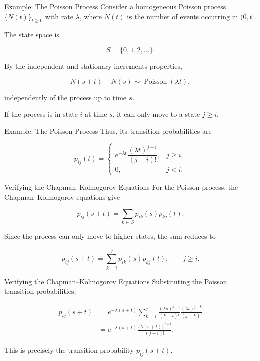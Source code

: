 \documentclass[
  ignorenonframetext,
  aspectratio=169,
]{beamer}
\begin{document}
\begin{frame}{Example: The Poisson Process}
\protect{}\label{example-the-poisson-process}
Consider a homogeneous Poisson process \(\{N(t)\}_{t\geq 0}\) with rate
\(\lambda\), where \(N(t)\) is the number of events occurring in
\((0,t]\).

The state space is

\[
S=\{0,1,2,\ldots\}.
\]

By the independent and stationary increments properties,

\[
N(s+t)-N(s)\sim\operatorname{Poisson}(\lambda t),
\]

independently of the process up to time \(s\).

If the process is in state \(i\) at time \(s\), it can only move to a
state \(j\geq i\).
\end{frame}

\begin{frame}{Example: The Poisson Process}
\protect{}\label{example-the-poisson-process-1}
Thus, its transition probabilities are

\[
\boxed{
p_{ij}(t)=
\begin{cases}
e^{-\lambda t}
\dfrac{(\lambda t)^{j-i}}{(j-i)!},
& j\geq i,\\[8pt]
0, & j<i.
\end{cases}
}
\]
\end{frame}

\begin{frame}{Verifying the Chapman--Kolmogorov Equations}
\protect{}\label{verifying-the-chapmankolmogorov-equations}
For the Poisson process, the Chapman--Kolmogorov equations give

\[
p_{ij}(s+t)
=
\sum_{k\in S}p_{ik}(s)p_{kj}(t).
\]

Since the process can only move to higher states, the sum reduces to

\[
p_{ij}(s+t)
=
\sum_{k=i}^{j}p_{ik}(s)p_{kj}(t),
\qquad j\geq i.
\]
\end{frame}

\begin{frame}{Verifying the Chapman--Kolmogorov Equations}
\protect{}\label{verifying-the-chapmankolmogorov-equations-1}
Substituting the Poisson transition probabilities,

\[
\begin{aligned}
p_{ij}(s+t)
&=e^{-\lambda(s+t)}
\sum_{k=i}^{j}
\frac{(\lambda s)^{k-i}}{(k-i)!}
\frac{(\lambda t)^{j-k}}{(j-k)!}\\
&=e^{-\lambda(s+t)}
\frac{\{\lambda(s+t)\}^{j-i}}{(j-i)!}.
\end{aligned}
\]

This is precisely the transition probability \(p_{ij}(s+t)\).
\end{frame}
\end{document}

